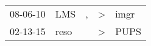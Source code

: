 \begin{supertabular}{p{0.07\textwidth}p{0.06\textwidth}p{0.02\textwidth}p{0.02\textwidth}p{0.06\textwidth}}
 08-06-10\textsuperscript{} &   LMS\textsuperscript{} &  , &  \textgreater &  imgr\textsuperscript{} \\
 02-13-15\textsuperscript{} &  reso\textsuperscript{} &    &  \textgreater &  PUPS\textsuperscript{} \\
\end{supertabular}
